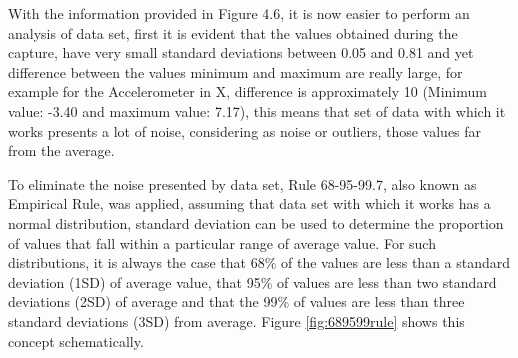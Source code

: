 \vspace{5mm} %

With the information provided in Figure 4.6, it is now easier to perform an analysis of data set, first it is evident that the values obtained during the capture, have very small standard deviations between 0.05 and 0.81 and yet difference between the values minimum and maximum are really large, for example for the Accelerometer in X, difference is approximately 10 (Minimum value: -3.40 and maximum value: 7.17), this means that set of data with which it works presents a lot of noise, considering as noise or outliers, those values far from the average.

\vspace{5mm} %

To eliminate the noise presented by data set, Rule 68-95-99.7, also known as Empirical Rule, was applied, assuming that data set with which it works has a normal distribution, standard deviation can be used to determine the proportion of values that fall within a particular range of average value. For such distributions, it is always the case that 68\% of the values are less than a standard deviation (1SD) of average value, that 95\% of values are less than two standard deviations (2SD) of average and that the 99\% of values are less than three standard deviations (3SD) from average. Figure \ref{fig:689599rule} shows this concept schematically.

